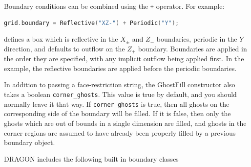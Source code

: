 \documentclass[11pt]{report}
\newcommand{\cpp}[1]{\lstinline[language=C++]{#1}}
\begin{document}
Boundary conditions can be combined using the \cpp{+} operator. For example:
\begin{lstlisting}[language=C++]
grid.boundary = Reflective("XZ-") + Periodic("Y");
\end{lstlisting}
defines a box which is reflective in the $X_\pm$ and $Z_-$  boundaries, periodic in the $Y$ direction,  and defaults to outflow on the $Z_+$ boundary. Boundaries are applied in the order they are specified, with any implicit outflow being applied first. In the example, the reflective boundaries are applied before the periodic boundaries.

In addition to passing a face-restriction string, the GhostFill constructor also takes a boolean \cpp{corner_ghosts}. This value is true by default, and you should normally leave it that way. If \cpp{corner_ghosts} is true, then all ghosts on the corresponding side of the boundary will be filled. If it is false, then only the ghosts which are out of bounds in a single dimension are filled, and ghosts in the corner regions are assumed to have already been properly filled by a previous boundary object.

DRAGON includes the following built in boundary classes 
\end{document}
